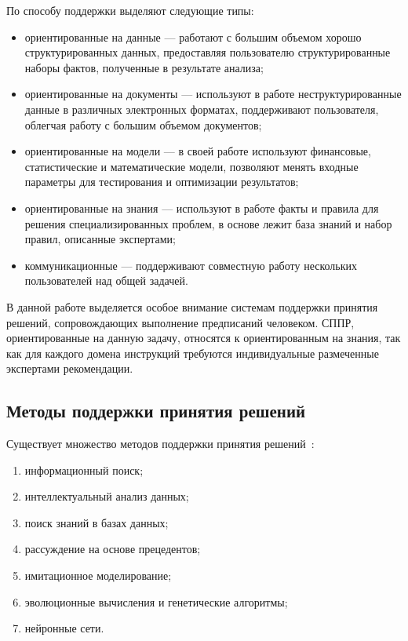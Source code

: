 По способу поддержки выделяют следующие типы:
\begin{itemize} 
    \item ориентированные на данные --- работают с большим объемом хорошо структурированных данных, предоставляя пользователю структурированные наборы фактов, полученные в результате анализа;
    \item ориентированные на документы --- используют в работе неструктурированные данные в различных электронных форматах, поддерживают пользователя, облегчая работу с большим объемом документов;
    \item ориентированные на модели --- в своей работе используют финансовые, статистические и математические модели, позволяют менять входные параметры для тестирования и оптимизации результатов;
    \item ориентированные на знания --- используют в работе факты и правила для решения специализированных проблем, в основе лежит база знаний и набор правил, описанные экспертами;
    \item коммуникационные --- поддерживают совместную работу нескольких пользователей над общей задачей.
\end{itemize}

В данной работе выделяется особое внимание системам поддержки принятия решений, сопровождающих выполнение предписаний человеком.
СППР, ориентированные на данную задачу, относятся к ориентированным на знания, так как для каждого домена инструкций требуются индивидуальные размеченные экспертами рекомендации.

\subsection{Методы поддержки принятия решений}
Существует множество методов поддержки принятия решений~\cite{obzor}:
\begin{enumerate} 
    \item информационный поиск;
    \item интеллектуальный анализ данных;
    \item поиск знаний в базах данных;
    \item рассуждение на основе прецедентов;
    \item имитационное моделирование;
    \item эволюционные вычисления и генетические алгоритмы;
    \item нейронные сети.
\end{enumerate}

